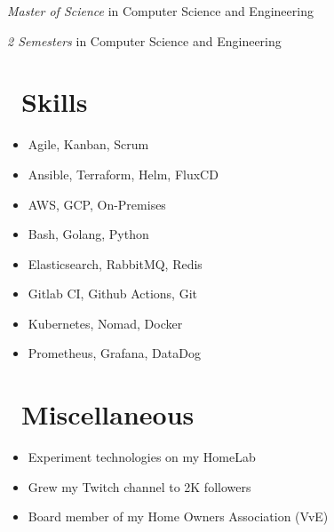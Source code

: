 \documentclass{resume}
\begin{document}
\textit{Master of Science} in Computer Science and Engineering

\textit{2 Semesters} in Computer Science and Engineering

\section{\texorpdfstring{\textbf{}\ Skills}{Skills}}

\begin{itemize}[parsep=0.5ex]
  \item Agile, Kanban, Scrum
  \item Ansible, Terraform, Helm, FluxCD
  \item AWS, GCP, On-Premises
  \item Bash, Golang, Python
  \item Elasticsearch, RabbitMQ, Redis
  \item Gitlab CI, Github Actions, Git
  \item Kubernetes, Nomad, Docker
  \item Prometheus, Grafana, DataDog
\end{itemize}

\section{\texorpdfstring{\textbf{}\ Miscellaneous}{Miscellaneous}}
\begin{itemize}[parsep=0.5ex]
  \item Experiment technologies on my HomeLab
  \item Grew my Twitch channel to 2K followers
  \item Board member of my Home Owners Association (VvE)
\end{itemize}
\end{document}
